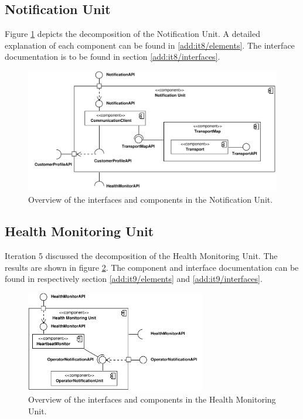 \subsection{Notification Unit}

\npar Figure \ref{fig:final-architecture/it8} depicts the decomposition of the
Notification Unit. A detailed explanation of each component can be found in
\ref{add:it8/elements}. The interface documentation is to be found in section
\ref{add:it8/interfaces}.

\begin{figure}
	\begin{centering}
		\includegraphics[width=\textwidth]{figs/add-it8-interfaces.pdf}
		\caption{Overview of the interfaces and components in the Notification Unit.}
		\label{fig:final-architecture/it8}
	\end{centering}
\end{figure}

\subsection{Health Monitoring Unit}

\npar Iteration 5 discussed the decomposition of the Health Monitoring Unit. The
results are shown in figure \ref{fig:final-architecture/it9}. The component and
interface documentation can be found in respectively section
\ref{add:it9/elements} and \ref{add:it9/interfaces}.

\begin{figure}
	\begin{centering}
		\includegraphics[width=0.7\textwidth]{figs/add-it9-interfaces.pdf}
		\caption{Overview of the interfaces and components in the Health Monitoring
		Unit.}
		\label{fig:final-architecture/it9}
	\end{centering}
\end{figure}

